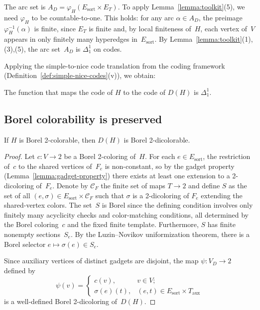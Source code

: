 \documentclass[12pt]{article}
\newcommand{\CF}{\mathcal{C}_F}
\begin{document}
The arc set is $A_D = \varphi_H(E_{\mathrm{sort}}\times E_T)$.
To apply Lemma~\ref{lemma:toolkit}(5), we need $\varphi_H$ to be countable-to-one.
This holds: for any arc $\alpha\in A_D$, the preimage $\varphi_H^{-1}(\alpha)$ is finite, since $E_T$ is finite and, by local finiteness of~$H$, each vertex of~$V$ appears in only finitely many hyperedges in~$E_{\mathrm{sort}}$.
By Lemma~\ref{lemma:toolkit}(1),(3),(5), the arc set~$A_D$ is $\Delta^1_1$ on codes.

Applying the simple-to-nice code translation from the coding framework (Definition~\ref{def:simple-nice-codes}(v)), we obtain:

\begin{lemma}\label{lem:code-reduction}
	The function that maps the code of $H$ to the code of $D(H)$ is $\Delta^1_1$.
\end{lemma}

\subsection{Borel colorability is preserved}

\begin{claim}\label{claim:forward}
	If $H$ is Borel 2-colorable, then $D(H)$ is Borel 2-dicolorable.
\end{claim}

\begin{proof}
Let $c\colon V\to 2$ be a Borel 2-coloring of~$H$.
For each $e\in E_{\mathrm{sort}}$, the restriction of~$c$ to the shared vertices of~$F_e$ is non-constant, so by the gadget property (Lemma~\ref{lemma:gadget-property}) there exists at least one extension to a 2-dicoloring of~$F_e$.
Denote by $\CF$ the finite set of maps $T\to 2$ and define $S$ as the set of all $(e,\sigma)\in E_{\mathrm{sort}}\times\CF$ such that $\sigma$ is a 2-dicoloring of $F_e$ extending the shared-vertex colors.
The set~$S$ is Borel since the defining condition involves only finitely many acyclicity checks and color-matching conditions, all determined by the Borel coloring~$c$ and the fixed finite template.
Furthermore, $S$ has finite nonempty sections~$S_e$.
By the Luzin--Novikov uniformization theorem, there is a Borel selector $e\mapsto\sigma(e)\in S_e$.

Since auxiliary vertices of distinct gadgets are disjoint, the map $\psi\colon V_D\to 2$ defined by
$$\psi(v) =\begin{cases}c(v),&v\in V;\\
	\sigma(e)(t),&(e,t)\in E_{\mathrm{sort}}\times T_{\mathrm{aux}}\end{cases}$$
is a well-defined Borel 2-dicoloring of~$D(H)$.
\end{proof}
\end{document}
